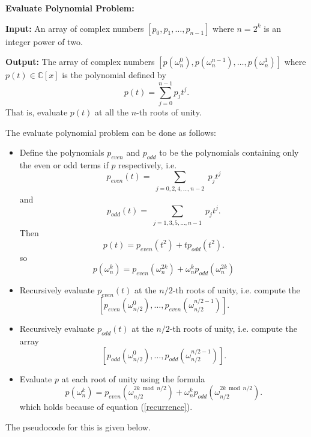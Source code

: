 \documentclass[12pt]{article}
\newcommand{\C}{\mathbb{C}}
\begin{document}
\begin{mdframed}
    \textbf{Evaluate Polynomial Problem:}

    \textbf{Input:}
    An array of complex numbers $[p_0, p_1 , \dots , p_{n-1}]$ where $n = 2^k$ is an integer power of two.

    \textbf{Output:}
    The array of complex numbers $[p(\omega_n^0), p(\omega_n^{n-1}), \dots , p(\omega_n^1)]$ where $p(t) \in \C[x]$ is the polynomial defined by
    \[
        p(t) = \sum_{j=0}^{n-1} p_jt^j.
    \]
    That is, evaluate $p(t)$ at all the $n$-th roots of unity.
\end{mdframed}
The evaluate polynomial problem can be done as follows:
\begin{itemize}
    \item Define the polynomials $p_{even}$ and $p_{odd}$ to be the polynomials containing only the even or odd terms if $p$ respectively, i.e.
          \[
              p_{even}(t) = \sum_{\substack{j= 0, 2, 4, \dots , n-2}}p_jt^j
          \]
          and
          \[
              p_{odd}(t) = \sum_{\substack{j = 1, 3, 5, \dots , n-1}}p_jt^j.
          \]
          Then
          \[
              p(t) = p_{even}(t^2)+tp_{odd}(t^2).
          \]
          so
          \begin{equation} \label{recurrence}
              p(\omega_n^k) = p_{even}(\omega_n^{2k})+\omega_n^k p_{odd}(\omega_n^{2k})
          \end{equation}

    \item Recursively evaluate $p_{even}(t)$ at the $n/2$-th roots of unity, i.e. compute the
          \[
              [p_{even}(\omega_{n/2}^0), \dots , p_{even}(\omega_{n/2}^{n/2-1})].
          \]

    \item Recursively evaluate $p_{odd}(t)$ at the $n/2$-th roots of unity, i.e. compute the array
          \[
              [p_{odd}(\omega_{n/2}^0), \dots , p_{odd}(\omega_{n/2}^{n/2-1})].
          \]

    \item Evaluate $p$ at each root of unity using the formula
          \[
              p(\omega_n^k) = p_{even}(\omega_{n/2}^{2k \bmod{n/2}})+ \omega_{n}^k p_{odd}(\omega_{n/2}^{2k \bmod{n/2}}).
          \]
          which holds because of equation (\ref{recurrence}).
\end{itemize}

The pseudocode for this is given below.
\end{document}
